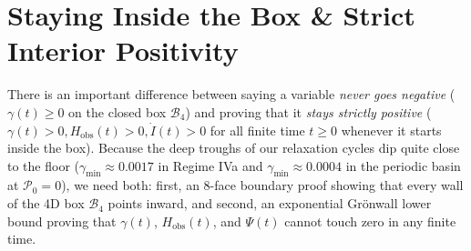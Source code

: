 \documentclass[11pt,a4paper]{article}
\theoremstyle{definition}
\begin{document}
\section{Staying Inside the Box \& Strict Interior Positivity}
\label{sec:containment}

There is an important difference between saying a variable \emph{never goes negative} ($\gamma(t) \ge 0$ on the closed box $\mathcal{B}_4$) and proving that it \emph{stays strictly positive} ($\gamma(t) > 0, H_{\mathrm{obs}}(t) > 0, \dot{I}(t) > 0$ for all finite time $t \ge 0$ whenever it starts inside the box). Because the deep troughs of our relaxation cycles dip quite close to the floor ($\gamma_{\min} \approx 0.0017$ in Regime IVa and $\gamma_{\min} \approx 0.0004$ in the periodic basin at $\mathcal{P}_0 = 0$), we need both: first, an 8-face boundary proof showing that every wall of the 4D box $\mathcal{B}_4$ points inward, and second, an exponential Gr\"onwall lower bound proving that $\gamma(t)$, $H_{\mathrm{obs}}(t)$, and $\Psi(t)$ cannot touch zero in any finite time.
\end{document}
